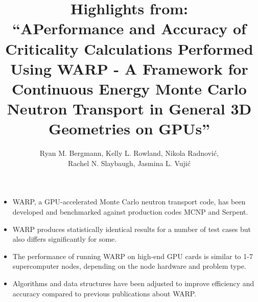 \documentclass{article}
\begin{document}

\title{Highlights from:\\ ``APerformance and Accuracy of Criticality Calculations Performed Using WARP - A Framework for Continuous Energy Monte Carlo Neutron Transport in General 3D Geometries on GPUs''}
\author{Ryan M. Bergmann, Kelly L. Rowland, Nikola Radnovi\'c, \\ Rachel N. Slaybaugh, Jasmina L. Vuji\'c}
\maketitle

\begin{itemize}
\item WARP, a GPU-accelerated Monte Carlo neutron transport code, has been developed and benchmarked against production codes MCNP and Serpent.
\item WARP produces statistically identical results for a number of test cases but also differs significantly for some.
\item The performance of running WARP on high-end GPU cards is similar to 1-7 supercomputer nodes, depending on the node hardware and problem type.
\item Algorithms and data structures have been adjusted to improve efficiency and accuracy compared to previous publications about WARP.
\end{itemize}
\end{document}
